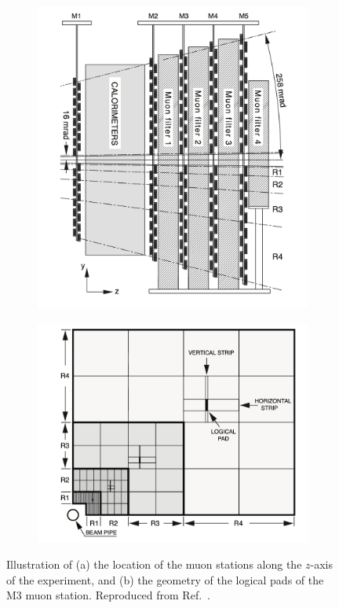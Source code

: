\begin{figure}[tb]
    \centering
\begin{subfigure}{0.45\columnwidth}
    \includegraphics[width=\columnwidth]{figures/detector/muon_stations.png}
    \caption{}
    \label{fig:muon_stations}
\end{subfigure}
\begin{subfigure}{0.45\columnwidth}
    \includegraphics[width=\columnwidth]{figures/detector/muon_pad.png}
    \caption{}
    \label{fig:muon_pad}
\end{subfigure}
    \caption{Illustration of (a) the location of the muon stations along the $z$-axis of the experiment, and (b) the geometry of the logical pads of the M3 muon station. Reproduced from Ref.~\cite{LHCb-Performance}.}
\end{figure}

